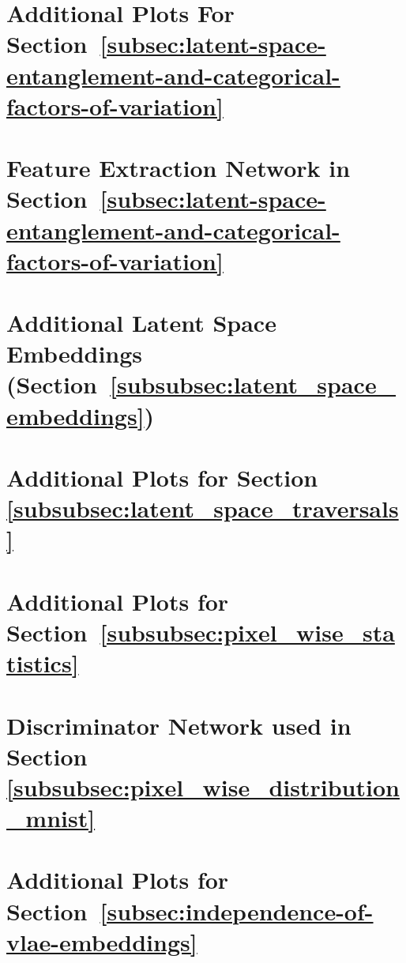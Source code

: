 \documentclass[11pt,a4paper]{article}
\let\oldsection\section
\renewcommand\section{\clearpage\oldsection}
\begin{document}
\pagebreak
\section{Additional Plots For Section~\ref{subsec:latent-space-entanglement-and-categorical-factors-of-variation}}\label{sec:additional_plots_latent_space_entanglement}


\pagebreak
\section{Feature Extraction Network in Section~\ref{subsec:latent-space-entanglement-and-categorical-factors-of-variation}}\label{sec:appendix_feature_extraction_network_ppl_dsprites}


\pagebreak
\section{Additional Latent Space Embeddings (Section~\ref{subsubsec:latent_space_embeddings})}


\pagebreak
\section{Additional Plots for Section \ref{subsubsec:latent_space_traversals}}\label{sec:appendix_plots_latent_space_traversals}



\pagebreak
\section{Additional Plots for Section~\ref{subsubsec:pixel_wise_statistics}}\label{sec:appendix_pixel_wise_statistics}


\pagebreak
\section{Discriminator Network used in Section \ref{subsubsec:pixel_wise_distribution_mnist}}\label{sec:listing_discriminator_network}


\pagebreak
\section{Additional Plots for Section~\ref{subsec:independence-of-vlae-embeddings}}\label{sec:additional-plots-for-section_independence}

\end{document}
